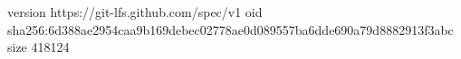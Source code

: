 version https://git-lfs.github.com/spec/v1
oid sha256:6d388ae2954caa9b169debec02778ae0d089557ba6dde690a79d8882913f3abc
size 418124
